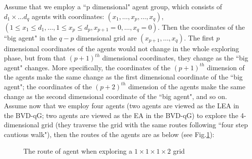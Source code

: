 Assume that we employ a ``p dimensional" agent group, which consists of $d_1 \times \ldots d_q$ agents with coordinates: $(x_1, \ldots, x_p, \ldots, x_q)$, $(1\leq x_1\leq d_1, \ldots, 1\leq x_p\leq d_p, x_{p+1}=0, \ldots, x_q=0)$. Then the coordinates of the ``big agent" in the $q-p$ dimensional grid are  $(x_{p+1},\ldots, x_q)$.
The first $p$ dimensional coordinates of the agents would not change in the whole exploring phase, but from that $(p+1)^{th}$ dimensional coordinates, they  change as the ``big agent" changes. More specifically, the coordinates of the  $(p+1)^{th}$ dimension   of the agents make the same change as the first dimensional coordinate of the ``big agent"; the coordinates of the  $(p+2)^{th}$  dimension of the agents make the same change as the second dimensional coordinate of the ``big agent", and so on. 
Assume  now that we   employ four agents (two agents are viewed as the LEA in the BVD-qG; two agents are viewed as the EA in the BVD-qG) to explore the 4-dimensional grid (they traverse the grid with the same routes following ``four step cautious walk"), then the routes of the agents are as below (see Fig.\ref{fig:grouproute}):
\begin{figure} [H]
  \centering 
    \hspace{1in} 
    \caption{The route of agent when exploring a $1\times1\times1\times2$ grid } 
  \label{fig:grouproute} %
\end{figure}

